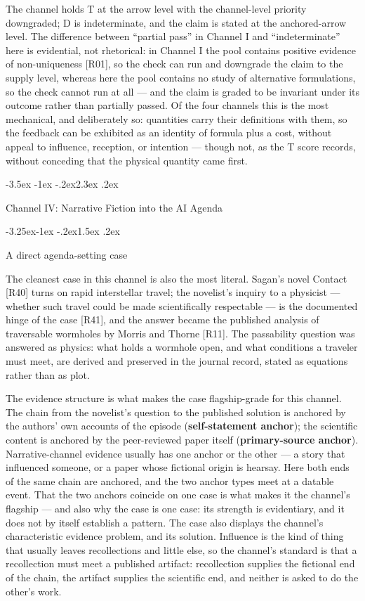 \documentclass[11pt,a4paper]{article}
\makeatletter
\renewcommand\section{\@startsection{section}{1}{\z@}%
  {-3.5ex \@plus -1ex \@minus -.2ex}{2.3ex \@plus .2ex}%
  {\normalfont\Large\bfseries\raggedright}}
\renewcommand\subsection{\@startsection{subsection}{2}{\z@}%
  {-3.25ex\@plus -1ex \@minus -.2ex}{1.5ex \@plus .2ex}%
  {\normalfont\large\bfseries\raggedright}}
\makeatother
\begin{document}
The channel holds T at the arrow level with the channel-level priority downgraded; D is indeterminate, and the claim is stated at the anchored-arrow level. The difference between ``partial pass'' in Channel I and ``indeterminate'' here is evidential, not rhetorical: in Channel I the pool contains positive evidence of non-uniqueness [R01], so the check can run and downgrade the claim to the supply level, whereas here the pool contains no study of alternative formulations, so the check cannot run at all — and the claim is graded to be invariant under its outcome rather than partially passed. Of the four channels this is the most mechanical, and deliberately so: quantities carry their definitions with them, so the feedback can be exhibited as an identity of formula plus a cost, without appeal to influence, reception, or intention — though not, as the T score records, without conceding that the physical quantity came first.

\section{Channel IV: Narrative Fiction into the AI Agenda}

\subsection{A direct agenda-setting case}

The cleanest case in this channel is also the most literal. Sagan's novel Contact [R40] turns on rapid interstellar travel; the novelist's inquiry to a physicist — whether such travel could be made scientifically respectable — is the documented hinge of the case [R41], and the answer became the published analysis of traversable wormholes by Morris and Thorne [R11]. The passability question was answered as physics: what holds a wormhole open, and what conditions a traveler must meet, are derived and preserved in the journal record, stated as equations rather than as plot.

The evidence structure is what makes the case flagship-grade for this channel. The chain from the novelist's question to the published solution is anchored by the authors' own accounts of the episode (\textbf{self-statement anchor}); the scientific content is anchored by the peer-reviewed paper itself (\textbf{primary-source anchor}). Narrative-channel evidence usually has one anchor or the other — a story that influenced someone, or a paper whose fictional origin is hearsay. Here both ends of the same chain are anchored, and the two anchor types meet at a datable event. That the two anchors coincide on one case is what makes it the channel's flagship — and also why the case is one case: its strength is evidentiary, and it does not by itself establish a pattern. The case also displays the channel's characteristic evidence problem, and its solution. Influence is the kind of thing that usually leaves recollections and little else, so the channel's standard is that a recollection must meet a published artifact: recollection supplies the fictional end of the chain, the artifact supplies the scientific end, and neither is asked to do the other's work.
\end{document}
